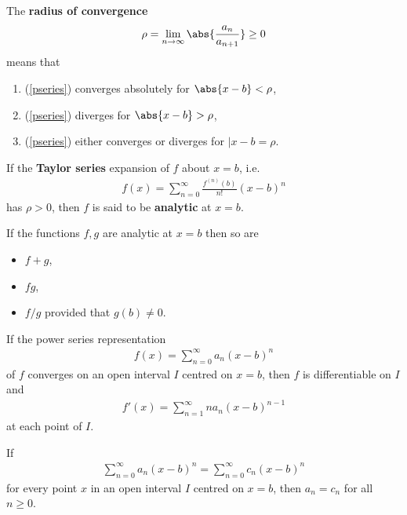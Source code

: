 \documentclass{article}
\begin{document}
\begin{definition}
	The \textbf{radius of convergence}
	\begin{align*}
		\rho=\lim_{n\to\infty}\abs{\frac{a_n}{a_{n+1}}}\geq 0
	\end{align*}
	means that
	\begin{enumerate}
		\item (\ref{pseries}) converges absolutely for $\abs{x-b}<\rho$,
		\item (\ref{pseries}) diverges for $\abs{x-b}>\rho$,
		\item (\ref{pseries}) either converges or diverges for $|x-b=\rho$.
	\end{enumerate}
\end{definition}
\begin{definition}
	If the \textbf{Taylor series} expansion of $f$ about $x=b$, i.e.
	\begin{align*}
		f(x)=\sum_{n=0}^\infty \frac{f^{(n)}(b)}{n!}(x-b)^n
	\end{align*}
	has $\rho>0$, then $f$ is said to be \textbf{analytic} at $x=b$.
\end{definition}
\begin{lemma}
	If the functions $f,g$ are analytic at $x=b$ then so are
	\begin{itemize}
		\item $f+g$,
		\item $fg$,
		\item $f/g$ provided that $g(b)\not=0$.
	\end{itemize}
\end{lemma}
\begin{theorem}
	If the power series representation
	\begin{align*}
		f(x)=\sum_{n=0}^\infty a_n(x-b)^n
	\end{align*}
	of $f$ converges on an open interval $I$ centred on $x=b$, then $f$
	is differentiable on $I$ and
	\begin{align*}
		f'(x)=\sum_{n=1}^\infty na_n(x-b)^{n-1}
	\end{align*}
	at each point of $I$.
\end{theorem}
\begin{theorem}
	If
	\begin{align*}
		\sum_{n=0}^\infty a_n(x-b)^n = \sum_{n=0}^\infty c_n(x-b)^n
	\end{align*}
	for every point $x$ in an open interval $I$ centred on $x=b$, then $a_n=c_n$
	for all $n\geq 0$.
\end{theorem}
\end{document}
